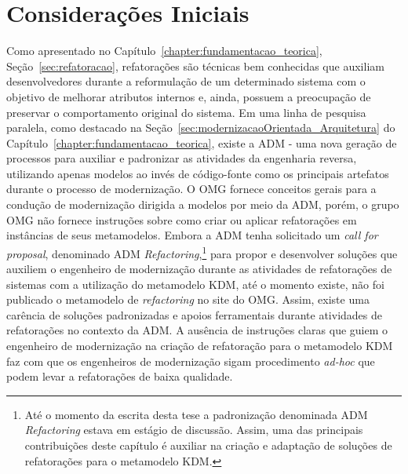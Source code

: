 \section{Considerações Iniciais}

Como apresentado no Capítulo~\ref{chapter:fundamentacao_teorica}, Seção~\ref{sec:refatoracao}, refatorações são técnicas bem conhecidas que auxiliam desenvolvedores durante a reformulação de um determinado sistema com o objetivo de melhorar atributos internos e, ainda, possuem a preocupação de preservar o comportamento original do sistema. Em uma linha de pesquisa paralela, como destacado na Seção~\ref{sec:modernizacaoOrientada_Arquitetura} do Capítulo~\ref{chapter:fundamentacao_teorica}, existe a ADM - uma nova geração de processos para auxiliar e padronizar as atividades da engenharia reversa, utilizando apenas modelos ao invés de código-fonte como os principais artefatos durante o processo de modernização. O OMG fornece conceitos gerais para a condução de modernização dirigida a modelos por meio da ADM, porém, o grupo OMG não fornece instruções sobre como criar ou aplicar refatorações em instâncias de seus metamodelos. Embora a ADM tenha solicitado um \textit{call for proposal}, denominado ADM \textit{Refactoring},\footnote{Até o momento da escrita desta tese a padronização denominada ADM \textit{Refactoring} estava em estágio de discussão. Assim, uma das principais contribuições deste capítulo é auxiliar na criação e adaptação de soluções de refatorações para o metamodelo KDM.} para propor e desenvolver soluções que auxiliem o engenheiro de modernização durante as atividades de refatorações de sistemas com a utilização do metamodelo KDM, até o momento existe, não foi publicado o metamodelo de \textit{refactoring} no site do OMG. Assim, existe uma carência de soluções padronizadas e apoios ferramentais durante atividades de refatorações no contexto da ADM. A ausência de instruções claras que guiem o engenheiro de modernização na criação de refatoração para o metamodelo KDM faz com que os engenheiros de modernização sigam procedimento \textit{ad-hoc} que podem levar a refatorações de baixa qualidade.






